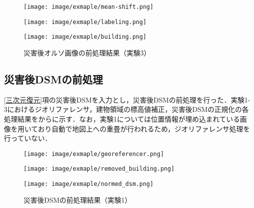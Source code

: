       \begin{figure}[t]
        \begin{minipage}[c]{0.329\hsize}
          \centering
          \texttt{[image: image/exmaple/mean-shift.png]}
        \end{minipage}
        \begin{minipage}[c]{0.329\hsize}
          \centering
          \texttt{[image: image/exmaple/labeling.png]}
        \end{minipage}
        \begin{minipage}[c]{0.329\hsize}
          \centering
          \texttt{[image: image/exmaple/building.png]}
        \end{minipage}
        \caption{災害後オルソ画像の前処理結果（実験3）}
        \label{災害後オルソ画像の前処理結果（実験3）}
      \end{figure}


    \subsection*{災害後DSMの前処理}
      \ref{三次元復元}項の災害後DSMを入力とし，災害後DSMの前処理を行った．実験1-3におけるジオリファレンサ，建物領域の標高値補正，災害後DSMの正規化の各処理結果をからに示す．なお，実験1については位置情報が埋め込まれている画像を用いており自動で地図上への重畳が行われるため，ジオリファレンサ処理を行っていない．

      \begin{figure}[t]
        \begin{minipage}[c]{0.329\hsize}
          \centering
          \texttt{[image: image/exmaple/georeferencer.png]}
        \end{minipage}
        \begin{minipage}[c]{0.329\hsize}
          \centering
          \texttt{[image: image/exmaple/removed\_building.png]}
        \end{minipage}
        \begin{minipage}[c]{0.329\hsize}
          \centering
          \texttt{[image: image/exmaple/normed\_dsm.png]}
        \end{minipage}
        \caption{災害後DSMの前処理結果（実験1）}
        \label{災害後DSMの前処理結果（実験1）}
      \end{figure}

